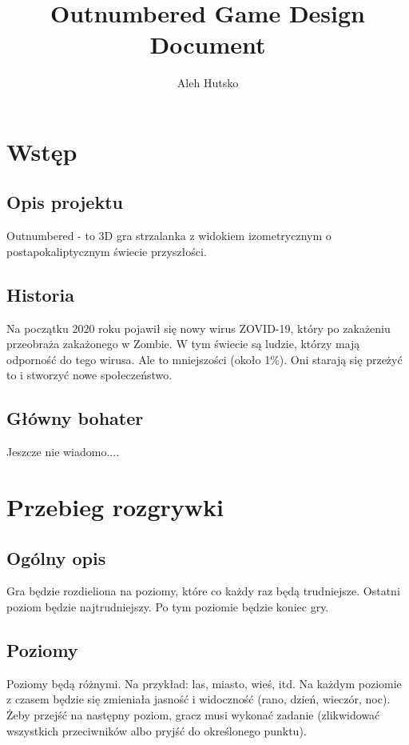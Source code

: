 \documentclass[letterpaper,12pt]{report}
\author{Aleh Hutsko}
\title{Outnumbered Game Design Document}
\date{}
\begin{document}
    \maketitle
    \clearpage
    \tableofcontents
    \clearpage
    \chapter{Wstęp}
    \section{Opis projektu}

    Outnumbered - to 3D gra strzalanka z widokiem
    izometrycznym o postapokaliptycznym świecie przyszłości.

    \section{Historia}

    Na początku 2020 roku pojawił się nowy wirus ZOVID-19,
    który po zakażeniu przeobraża zakażonego w Zombie. W tym
    świecie są ludzie, którzy mają odporność do tego wirusa.
    Ale to mniejszości (około 1\%). Oni starają się przeżyć to
    i stworzyć nowe społeczeństwo.


    \section{Główny bohater}

    \color{red}
    Jeszcze nie wiadomo....
    \color{black}


    \chapter{Przebieg rozgrywki}
    
    \section{Ogólny opis}

    Gra będzie rozdieliona na poziomy, które co każdy raz będą
    trudniejsze. Ostatni poziom będzie najtrudniejszy. Po tym 
    poziomie będzie koniec gry. 

    \section{Poziomy}

    Poziomy będą różnymi. Na przykład: las, miasto, wieś, itd.
    Na każdym poziomie z czasem będzie się zmieniała jasność i
    widoczność (rano, dzień, wieczór, noc). Żeby przejść na 
    następny poziom, gracz musi wykonać zadanie (zlikwidować wszystkich
    przeciwników albo pryjść do określonego punktu).  
\end{document}
